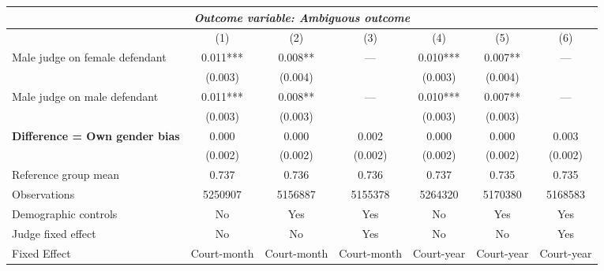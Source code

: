 {
\def\sym#1{\ifmmode^{#1}\else\(^{#1}\)\fi}
\begin{tabular}{l*{6}{c}}
  \hline\hline
\multicolumn{7}{c}{\textit{Outcome variable: Ambiguous outcome}}\\
\hline
&\multicolumn{1}{c}{(1)}&\multicolumn{1}{c}{(2)}&\multicolumn{1}{c}{(3)}&\multicolumn{1}{c}{(4)}&\multicolumn{1}{c}{(5)}&\multicolumn{1}{c}{(6)}\\
\hline
Male judge on female defendant \hspace{15mm} & 0.011*** & 0.008** & --- & 0.010*** & 0.007** & --- \\
& (0.003) & (0.004) &  & (0.003) &(0.004) &  \\
Male judge on male defendant \hspace{15mm} & 0.011*** & 0.008** & ---& 0.010*** & 0.007** & --- \\
& (0.003) & (0.003) &  & (0.003) & (0.003) &  \\
\textbf{Difference = Own gender bias} \hspace{15mm} & 0.000 & 0.000 & 0.002 & 0.000 & 0.000 & 0.003 \\
& (0.002) & (0.002) & (0.002) & (0.002) & (0.002) & (0.002) \\
\hline
Reference group mean & 0.737 & 0.736 & 0.736 & 0.737 & 0.735 & 0.735 \\
Observations & 5250907 & 5156887 & 5155378 & 5264320 & 5170380 & 5168583 \\
Demographic controls & No & Yes & Yes & No & Yes & Yes \\
Judge fixed effect & No & No & Yes & No & No & Yes \\
Fixed Effect & Court-month & Court-month & Court-month & Court-year & Court-year & Court-year \\
\hline\hline
\end{tabular}
}
 
